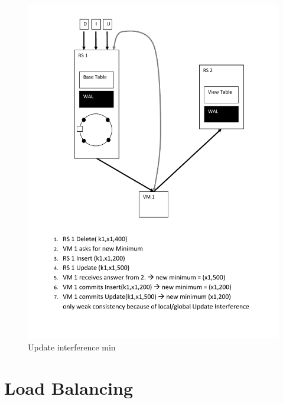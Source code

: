 \begin{figure}[h!]
  \centering
    \includegraphics[scale=0.8]{figures/CO_UpdateInterferenceMin}
     \caption{Update interference min}
    \label{fig:co_updateinterferencemin}
\end{figure}
\newpage

\chapter{Load Balancing}
\label{chapter:loadbalancingappendix}


